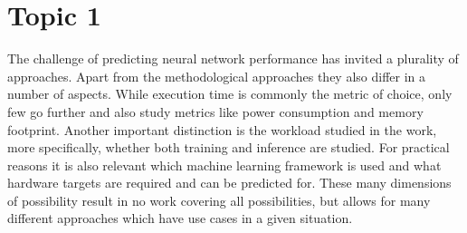 \section{Topic 1}
The challenge of predicting neural network performance has invited a plurality of approaches.
Apart from the methodological approaches they also differ in a number of aspects.
While execution time is commonly the metric of choice, only few go further and also study metrics
like power consumption and memory footprint. Another important distinction is the workload studied
in the work, more specifically, whether both training and inference are studied.
For practical reasons it is also relevant which machine learning framework is used and what hardware
targets are required and can be predicted for. These many dimensions of possibility result in no work
covering all possibilities, but allows for many different approaches which have use cases in a given
situation.\\
